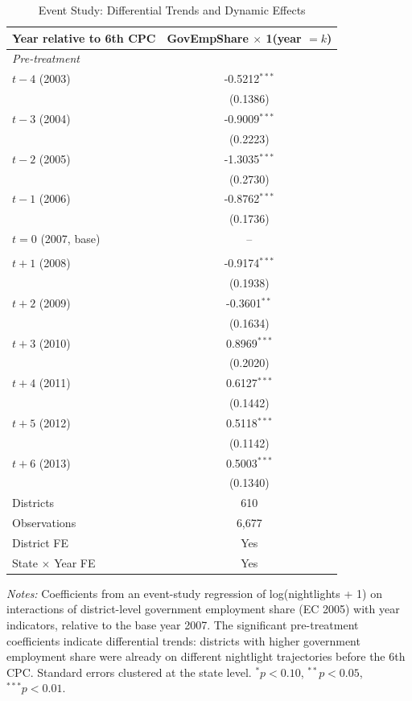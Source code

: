 \begin{table}[t]
\centering
\caption{Event Study: Differential Trends and Dynamic Effects}
\label{tab:event_study}
\begin{tabular}{lc}
\toprule
Year relative to 6th CPC & GovEmpShare $\times$ 1(year $= k$) \\
\midrule
\multicolumn{2}{l}{\textit{Pre-treatment}} \\[3pt]
$t - 4$ (2003) & -0.5212$^{***}$ \\
 & (0.1386) \\
$t - 3$ (2004) & -0.9009$^{***}$ \\
 & (0.2223) \\
$t - 2$ (2005) & -1.3035$^{***}$ \\
 & (0.2730) \\
$t - 1$ (2006) & -0.8762$^{***}$ \\
 & (0.1736) \\
$t = 0$ (2007, base) & -- \\
\addlinespace
\multicolumn{2}{l}{\textit{Post-treatment}} \\[3pt]
$t + 1$ (2008) & -0.9174$^{***}$ \\
 & (0.1938) \\
$t + 2$ (2009) & -0.3601$^{**}$ \\
 & (0.1634) \\
$t + 3$ (2010) & 0.8969$^{***}$ \\
 & (0.2020) \\
$t + 4$ (2011) & 0.6127$^{***}$ \\
 & (0.1442) \\
$t + 5$ (2012) & 0.5118$^{***}$ \\
 & (0.1142) \\
$t + 6$ (2013) & 0.5003$^{***}$ \\
 & (0.1340) \\
\addlinespace
Districts & 610 \\
Observations & 6,677 \\
District FE & Yes \\
State $\times$ Year FE & Yes \\
\bottomrule
\end{tabular}
\begin{tablenotes}
\item \textit{Notes:} Coefficients from an event-study regression of log(nightlights + 1) on interactions of district-level government employment share (EC 2005) with year indicators, relative to the base year 2007. The significant pre-treatment coefficients indicate differential trends: districts with higher government employment share were already on different nightlight trajectories before the 6th CPC. Standard errors clustered at the state level. $^{*}p<0.10$, $^{**}p<0.05$, $^{***}p<0.01$.
\end{tablenotes}
\end{table}
